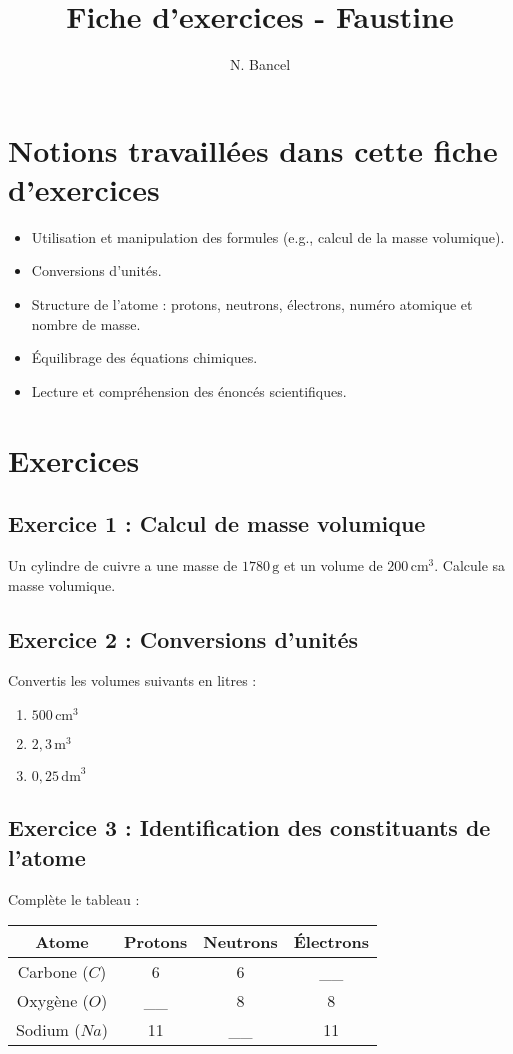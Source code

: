 \documentclass[a4paper,12pt]{article}
\begin{document}
\title{Fiche d'exercices - Faustine}
\author{N. Bancel}
\date{}
\maketitle

\section{Notions travaillées dans cette fiche d'exercices}
\begin{itemize}
    \item Utilisation et manipulation des formules (e.g., calcul de la masse volumique).
    \item Conversions d'unités.
    \item Structure de l'atome : protons, neutrons, électrons, numéro atomique et nombre de masse.
    \item Équilibrage des équations chimiques.
    \item Lecture et compréhension des énoncés scientifiques.
\end{itemize}

\section{Exercices}

\subsection*{Exercice 1 : Calcul de masse volumique}
Un cylindre de cuivre a une masse de \( 1780 \, \text{g} \) et un volume de \( 200 \, \text{cm}^3 \). Calcule sa masse volumique.

\subsection*{Exercice 2 : Conversions d'unités}
Convertis les volumes suivants en litres :
\begin{enumerate}
    \item \( 500 \, \text{cm}^3 \)
    \item \( 2,3 \, \text{m}^3 \)
    \item \( 0,25 \, \text{dm}^3 \)
\end{enumerate}

\subsection*{Exercice 3 : Identification des constituants de l'atome}
Complète le tableau :
\begin{tabular}{|c|c|c|c|}
\hline
Atome & Protons & Neutrons & Électrons \\
\hline
Carbone (\( C \)) & 6 & 6 & \_\_ \\
\hline
Oxygène (\( O \)) & \_\_ & 8 & 8 \\
\hline
Sodium (\( Na \)) & 11 & \_\_ & 11 \\
\hline
\end{tabular}
\end{document}
